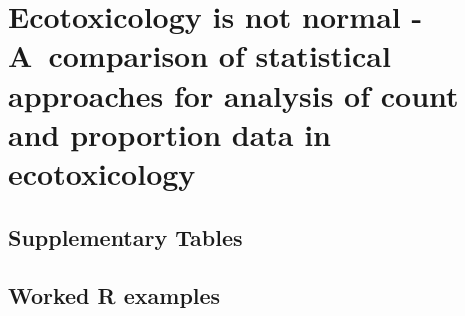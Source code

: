 \chapter[Ecotoxicology is not normal]{Ecotoxicology is not normal - A~comparison of statistical approaches for analysis of count and proportion data in ecotoxicology}
\label{ap:usetheglm}  

\section{Supplementary Tables}
\label{ap:usetheglm:tables}  











\FloatBarrier

\section{Worked R examples}
\label{ap:usetheglm:examples}  

